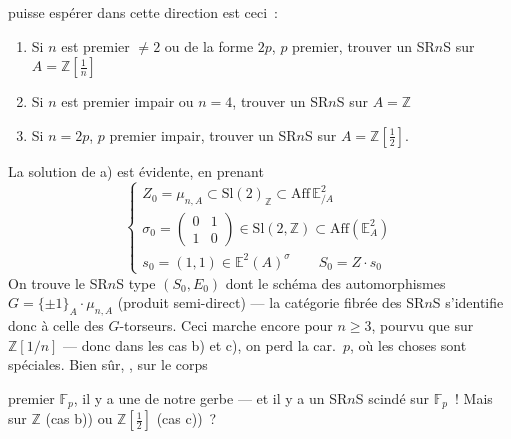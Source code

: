\documentclass[11pt,a4paper]{article}
\begin{document}
puisse espérer dans cette direction est ceci~:
\begin{enumerate}
  \item[a)] Si $n$  est premier $\neq 2$ ou de la forme $2p$, $p$ premier, trouver un SR$n$S sur $A = \mathbb{Z}[\frac{1}{n}]$
  \item[b)] Si $n$ est premier impair ou $n = 4$, trouver un SR$n$S sur $A = \mathbb{Z}$
  \item[c)] Si $n = 2p$, $p$ premier impair, trouver un SR$n$S sur $A = \mathbb{Z}[\frac{1}{2}]$.
\end{enumerate}

La solution de a) est évidente, en prenant
\[
  \begin{cases}
    Z_0 = \mu_{n,A} \subset \mathrm{Sl}(2)_{\mathbb{Z}} \subset \mathrm{Aff}\,\mathbb{E}^{2}_{/A} \\
    \sigma_0 = \begin{pmatrix} 0 & 1 \\ 1 & 0 \end{pmatrix} \in \mathrm{Sl}(2,\mathbb{Z}) \subset \mathrm{Aff}(\mathbb{E}^{2}_{A}) \\
    s_0 = (1,1) \in \mathbb{E}^{2}(A)^{\sigma} \qquad S_0 = Z \cdot s_0
  \end{cases}
\]
On trouve le  SR$n$S type $(S_0,E_0)$ dont le schéma des automorphismes $G = \{\pm 1\}_A \cdot \mu_{n,A}$ (produit semi-direct) --- la catégorie fibrée des SR$n$S s'identifie donc à celle des $G$-torseurs. Ceci marche encore pour  $n \geq 3$, pourvu que \ill{} sur $\mathbb{Z}[1/n]$ --- donc dans les cas b) et c), on perd la car.\ $p$, où les choses sont spéciales. Bien sûr,  , sur le corps


premier $\mathbb{F}_p$, il y a une   de notre gerbe --- et il y a un SR$n$S scindé sur $\mathbb{F}_p$~! Mais sur $\mathbb{Z}$ (cas b)) ou $\mathbb{Z}[\frac{1}{2}]$ (cas c))~? 

\end{document}
